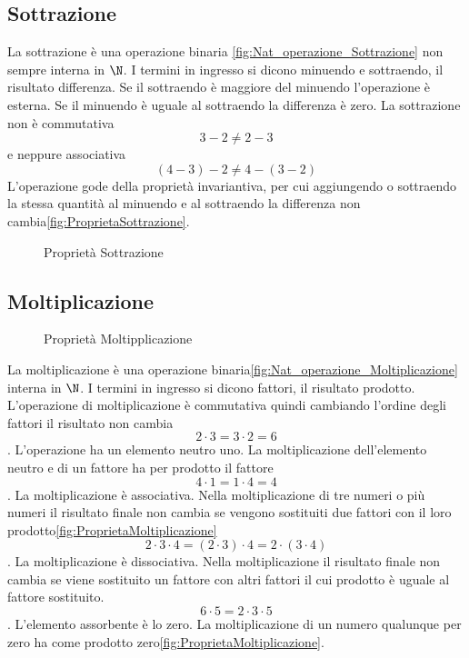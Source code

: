 \subsection{Sottrazione}
La sottrazione è una operazione binaria \nobs\vref{fig:Nat_operazione_Sottrazione} non sempre interna in $\N$. I termini in ingresso si dicono minuendo e sottraendo, il risultato differenza. Se il sottraendo è maggiore del minuendo l'operazione è esterna. Se il minuendo è uguale al sottraendo la differenza è zero. La sottrazione non è commutativa \[3-2\neq2-3\] e neppure associativa \[(4-3)-2\neq4-(3-2)\]
 L'operazione gode della proprietà invariantiva, per cui aggiungendo o sottraendo la stessa quantità al minuendo e al sottraendo la differenza non cambia\nobs\vref{fig:ProprietaSottrazione}.  
\label{sec:NumerinatDiff}
\begin{figure} %
	\centering

	\caption{Proprietà Sottrazione}
	\label{fig:ProprietaSottrazione}\end{figure}
\subsection{Moltiplicazione}
\label{sec:NumerinatMolt}
\begin{figure} %
	\centering

	\caption{Proprietà Moltipplicazione}
	\label{fig:ProprietaMoltiplicazione}\end{figure}
La moltiplicazione è una operazione binaria\nobs\vref{fig:Nat_operazione_Moltiplicazione}  interna in $\N$. I termini in ingresso si dicono fattori, il risultato prodotto. L'operazione di moltiplicazione  è commutativa quindi cambiando l'ordine degli fattori il risultato non cambia \[2\cdot3=3\cdot2=6\]. L'operazione ha un elemento neutro uno. La moltiplicazione dell'elemento neutro e di un fattore ha per prodotto il fattore  \[4\cdot1=1\cdot4=4\]. La moltiplicazione è associativa. Nella moltiplicazione di tre numeri o più numeri il risultato finale non cambia se vengono sostituiti due fattori con il loro prodotto\nobs\vref{fig:ProprietaMoltiplicazione} \[2\cdot3\cdot4=(2\cdot3)\cdot4=2\cdot(3\cdot4)\]. La moltiplicazione è dissociativa. Nella moltiplicazione  il risultato finale non cambia se viene sostituito un fattore con altri fattori il cui prodotto è uguale al fattore sostituito.  \[6\cdot5=2\cdot3\cdot5\]. L'elemento assorbente è lo zero. La moltiplicazione di un numero qualunque per zero ha come prodotto zero\nobs\vref{fig:ProprietaMoltiplicazione}.
